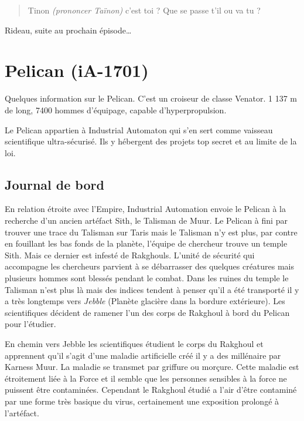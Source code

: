 \begin{quote}
	Tinon \emph{(prononcer Taïnon)} c'est toi ? Que se passe t'il ou va tu ?
\end{quote}

Rideau, suite au prochain épisode\ldots


\clearpage
\section{Pelican (iA-1701)}

Quelques information sur le Pelican. C'est un croiseur de classe Venator. 1 137 m de long, 7400 hommes d'équipage, capable d'hyperpropulsion.

Le Pelican appartien à Industrial Automaton qui s'en sert comme vaisseau scientifique ultra-sécurisé. Ils y hébergent des projets top secret et au limite de la loi.

\subsection{Journal de bord}
\label{sec:pelican-jdb}
En relation étroite avec l'Empire, Industrial Automation envoie le Pelican à la recherche d'un ancien artéfact Sith, le Talisman de Muur. Le Pelican à fini par trouver une trace du Talisman sur Taris mais le Talisman n'y est plus, par contre en fouillant les bas fonds de la planète, l'équipe de chercheur trouve un temple Sith. Mais ce dernier est infesté de Rakghouls. L'unité de sécurité qui accompagne les chercheurs parvient à se débarrasser des quelques créatures mais plusieurs hommes sont blessés pendant le combat. Dans les ruines du temple le Talisman n'est plus là mais des indices tendent à penser qu'il a été transporté il y a très longtemps vers \emph{Jebble} (Planète glacière dans la bordure extérieure). Les scientifiques décident de ramener l'un des corps de Rakghoul à bord du Pelican pour l'étudier.

En chemin vers Jebble les scientifiques étudient le corps du Rakghoul et apprennent qu'il s'agit d'une maladie artificielle créé il y a des millénaire par Karness Muur. La maladie se transmet par griffure ou morçure. Cette maladie est étroitement liée à la Force et il semble que les personnes sensibles à la force ne puissent être contaminées. Cependant le Rakghoul étudié a l'air d'être contaminé par une forme très basique du virus, certainement une exposition prolongé à l'artéfact.

